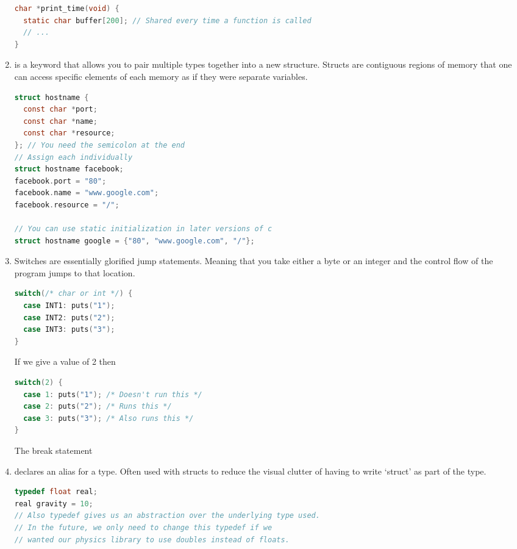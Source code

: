 \begin{enumerate}
\begin{lstlisting}[language=C]
char *print_time(void) {
  static char buffer[200]; // Shared every time a function is called
  // ...
}
\end{lstlisting}

\item {} is a keyword that allows you to pair multiple types together into a new structure. Structs are contiguous regions of memory that one can access specific elements of each memory as if they were separate variables.

\begin{lstlisting}[language=C]
struct hostname {
  const char *port;
  const char *name;
  const char *resource;
}; // You need the semicolon at the end
// Assign each individually
struct hostname facebook;
facebook.port = "80";
facebook.name = "www.google.com";
facebook.resource = "/";

// You can use static initialization in later versions of c
struct hostname google = {"80", "www.google.com", "/"};
\end{lstlisting}


\item {} Switches are essentially glorified jump statements. Meaning that you take either a byte or an integer and the control flow of the program jumps to that location.
\\
\begin{lstlisting}[language=C]
switch(/* char or int */) {
  case INT1: puts("1");
  case INT2: puts("2");
  case INT3: puts("3");
}
\end{lstlisting}

If we give a value of 2 then
\\
\begin{lstlisting}[language=C]
switch(2) {
  case 1: puts("1"); /* Doesn't run this */
  case 2: puts("2"); /* Runs this */
  case 3: puts("3"); /* Also runs this */
}
\end{lstlisting}

The break statement
\item {} declares an alias for a type. Often used with structs to reduce the visual clutter of having to write `struct' as part of the type.

\begin{lstlisting}[language=C]
typedef float real; 
real gravity = 10;
// Also typedef gives us an abstraction over the underlying type used. 
// In the future, we only need to change this typedef if we
// wanted our physics library to use doubles instead of floats.


\end{lstlisting}
\end{enumerate}
